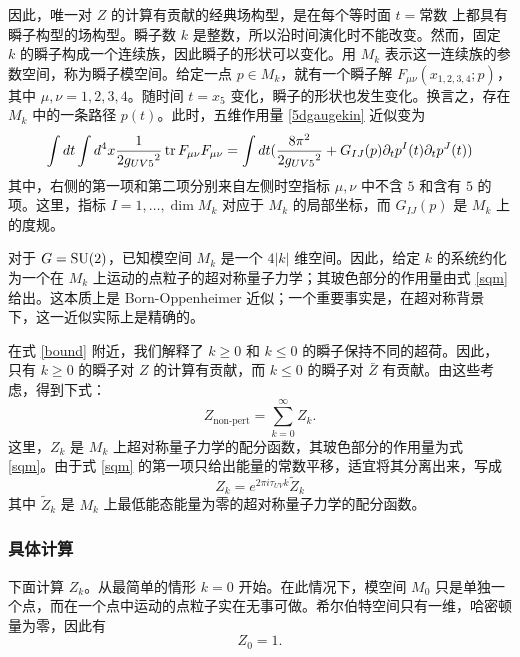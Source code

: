因此，唯一对 $Z$ 的计算有贡献的经典场构型，是在每个等时面 $t=\text{常数}$ 上都具有瞬子构型的场构型。瞬子数 $k$ 是整数，所以沿时间演化时不能改变。然而，固定 $k$ 的瞬子构成一个连续族，因此瞬子的形状可以变化。用 $M_k$ 表示这一连续族的参数空间，称为瞬子模空间。给定一点 $p\in M_k$，就有一个瞬子解 $F_{\mu\nu}(x_{1,2,3,4};p)$，其中 $\mu,\nu=1,2,3,4$。随时间 $t=x_5$ 变化，瞬子的形状也发生变化。换言之，存在 $M_k$ 中的一条路径 $p(t)$。此时，五维作用量 \eqref{5dgaugekin} 近似变为
\begin{equation}
\int dt\int d^4x\frac1{2g_{UV5}{}^2}\mathop{\mathrm{tr}}\nolimits F_{\mu\nu}F_{\mu\nu}
=\int dt(\frac{8\pi^2}{2g_{UV5}{}^2}+G_{IJ}(p)\partial_t p^I(t)\partial_t p^J(t))\label{sqm}
\end{equation}
其中，右侧的第一项和第二项分别来自左侧时空指标 $\mu,\nu$ 中不含 $5$ 和含有 $5$ 的项。这里，指标 $I=1,\ldots,\dim M_k$ 对应于 $M_k$ 的局部坐标，而 $G_{IJ}(p)$ 是 $M_k$ 上的度规。

对于 $G=\mathop{\mathrm{SU}}(2)$，已知模空间 $M_k$ 是一个 $4|k|$ 维空间。因此，给定 $k$ 的系统约化为一个在 $M_k$ 上运动的点粒子的超对称量子力学；其玻色部分的作用量由式 \eqref{sqm} 给出。这本质上是 Born-Oppenheimer 近似；一个重要事实是，在超对称背景下，这一近似实际上是精确的。

在式 \eqref{bound} 附近，我们解释了 $k\ge0$ 和 $k\le0$ 的瞬子保持不同的超荷。因此，只有 $k\ge0$ 的瞬子对 $Z$ 的计算有贡献，而 $k\le0$ 的瞬子对 $\bar Z$ 有贡献。由这些考虑，得到下式：
\begin{equation}
Z_\text{non-pert}=\sum_{k=0}^\infty Z_k.
\end{equation}
这里，$Z_k$ 是 $M_k$ 上超对称量子力学的配分函数，其玻色部分的作用量为式 \eqref{sqm}。由于式 \eqref{sqm} 的第一项只给出能量的常数平移，适宜将其分离出来，写成
\begin{equation}
Z_k=e^{2\pi i\tau_{UV}k}\tilde Z_k\label{constantshift}
\end{equation}
其中 $\tilde Z_k$ 是 $M_k$ 上最低能态能量为零的超对称量子力学的配分函数。

\subsubsection{具体计算}
下面计算 $Z_k$。从最简单的情形 $k=0$ 开始。在此情况下，模空间 $M_0$ 只是单独一个点，而在一个点中运动的点粒子实在无事可做。希尔伯特空间只有一维，哈密顿量为零，因此有
\begin{equation}
Z_0=1.
\end{equation}

